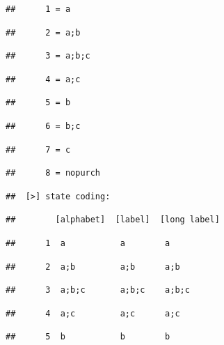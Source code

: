 \documentclass[
]{book}
\begin{document}
\begin{verbatim}
##      1 = a
\end{verbatim}

\begin{verbatim}
##      2 = a;b
\end{verbatim}

\begin{verbatim}
##      3 = a;b;c
\end{verbatim}

\begin{verbatim}
##      4 = a;c
\end{verbatim}

\begin{verbatim}
##      5 = b
\end{verbatim}

\begin{verbatim}
##      6 = b;c
\end{verbatim}

\begin{verbatim}
##      7 = c
\end{verbatim}

\begin{verbatim}
##      8 = nopurch
\end{verbatim}

\begin{verbatim}
##  [>] state coding:
\end{verbatim}

\begin{verbatim}
##        [alphabet]  [label]  [long label]
\end{verbatim}

\begin{verbatim}
##      1  a           a        a
\end{verbatim}

\begin{verbatim}
##      2  a;b         a;b      a;b
\end{verbatim}

\begin{verbatim}
##      3  a;b;c       a;b;c    a;b;c
\end{verbatim}

\begin{verbatim}
##      4  a;c         a;c      a;c
\end{verbatim}

\begin{verbatim}
##      5  b           b        b
\end{verbatim}
\end{document}
